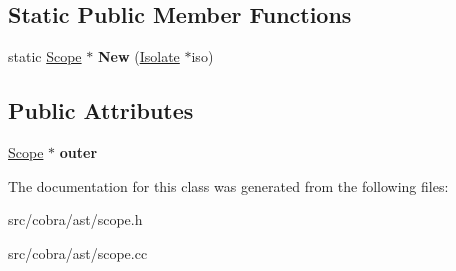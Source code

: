 \subsection*{Static Public Member Functions}
\begin{DoxyCompactItemize}
\item 
\hypertarget{class_cobra_1_1internal_1_1_scope_a24f1f0fc6667efb406d3c40904673aba}{static \hyperlink{class_cobra_1_1internal_1_1_scope}{Scope} $\ast$ {\bfseries New} (\hyperlink{class_cobra_1_1internal_1_1_isolate}{Isolate} $\ast$iso)}\label{class_cobra_1_1internal_1_1_scope_a24f1f0fc6667efb406d3c40904673aba}

\end{DoxyCompactItemize}
\subsection*{Public Attributes}
\begin{DoxyCompactItemize}
\item 
\hypertarget{class_cobra_1_1internal_1_1_scope_adb3cfd7157d939009831473f4162e121}{\hyperlink{class_cobra_1_1internal_1_1_scope}{Scope} $\ast$ {\bfseries outer}}\label{class_cobra_1_1internal_1_1_scope_adb3cfd7157d939009831473f4162e121}

\end{DoxyCompactItemize}


The documentation for this class was generated from the following files\+:\begin{DoxyCompactItemize}
\item 
src/cobra/ast/scope.\+h\item 
src/cobra/ast/scope.\+cc\end{DoxyCompactItemize}
